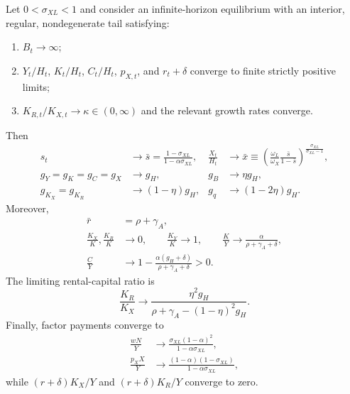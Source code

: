 \begin{proposition}
\label{prop:complements}
Let $0<\sigma_{XL}<1$ and consider an infinite-horizon equilibrium with an interior, regular, nondegenerate tail satisfying:
\begin{enumerate}
 \item $B_t\to\infty$;
 \item $Y_t/H_t$, $K_t/H_t$, $C_t/H_t$, $p_{X,t}$, and $r_t+\delta$ converge to finite strictly positive limits;
 \item $K_{R,t}/K_{X,t}\to\kappa\in(0,\infty)$ and the relevant growth rates converge.
\end{enumerate}
Then
\begin{align}
 s_t&\longrightarrow
 \bar s=\frac{1-\sigma_{XL}}{1-\alpha\sigma_{XL}},
 &\frac{X_t}{H_t}&\longrightarrow
 \bar x\equiv
 \left(\frac{\omega_L}{\omega_X}
 \frac{\bar s}{1-\bar s}\right)^{
 \frac{\sigma_{XL}}{\sigma_{XL}-1}},
 \label{eq:complements-sx}\\
 g_Y=g_K=g_C=g_X&\longrightarrow g_H,
 &g_B&\longrightarrow\eta g_H,
 \label{eq:complements-growth1}\\
 g_{K_X}=g_{K_R}&\longrightarrow(1-\eta)g_H,
 &g_q&\longrightarrow(1-2\eta)g_H.
 \label{eq:complements-growth2}
\end{align}
Moreover,
\begin{align}
 \bar r&=\rho+\gamma_A,
 \label{eq:complements-prices}\\
 \frac{K_X}{K},\frac{K_R}{K}&\longrightarrow0,\qquad
 \frac{K_Y}{K}\longrightarrow1,\qquad
 \frac{K}{Y}\longrightarrow
 \frac{\alpha}{\rho+\gamma_A+\delta},
 \label{eq:complements-capital}\\
 \frac{C}{Y}&\longrightarrow
 1-\frac{\alpha(g_H+\delta)}
 {\rho+\gamma_A+\delta}>0.
 \label{eq:complements-consumption}
\end{align}
The limiting rental-capital ratio is
\begin{equation}
 \frac{K_R}{K_X}\longrightarrow
 \frac{\eta^2g_H}
 {\rho+\gamma_A-(1-\eta)^2g_H}.
 \label{eq:complements-KR-KX}
\end{equation}
Finally, factor payments converge to
\begin{align}
 \frac{wN}{Y}&\longrightarrow
 \frac{\sigma_{XL}(1-\alpha)^2}
 {1-\alpha\sigma_{XL}},
 \label{eq:complements-labor-share}\\
 \frac{p_XX}{Y}&\longrightarrow
 \frac{(1-\alpha)(1-\sigma_{XL})}
 {1-\alpha\sigma_{XL}},
 \label{eq:complements-AI-share}
\end{align}
while $(r+\delta)K_X/Y$ and $(r+\delta)K_R/Y$ converge to zero.
\end{proposition}

